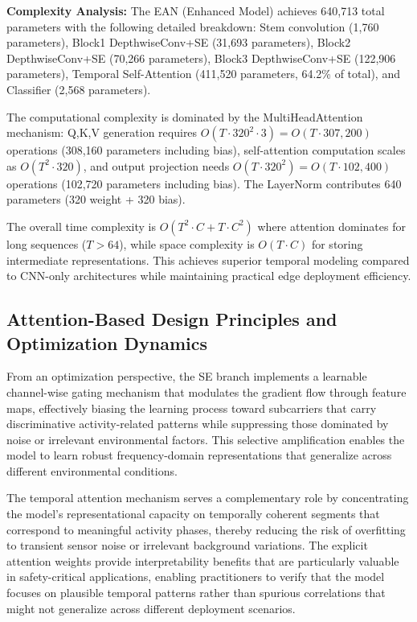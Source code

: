 \documentclass[lettersize,journal]{IEEEtran}
\begin{document}
\textbf{Complexity Analysis:} The EAN (Enhanced Model) achieves 640,713 total parameters with the following detailed breakdown: Stem convolution (1,760 parameters), Block1 DepthwiseConv+SE (31,693 parameters), Block2 DepthwiseConv+SE (70,266 parameters), Block3 DepthwiseConv+SE (122,906 parameters), Temporal Self-Attention (411,520 parameters, 64.2\% of total), and Classifier (2,568 parameters). 

The computational complexity is dominated by the MultiHeadAttention mechanism: Q,K,V generation requires $O(T \cdot 320^2 \cdot 3) = O(T \cdot 307,200)$ operations (308,160 parameters including bias), self-attention computation scales as $O(T^2 \cdot 320)$, and output projection needs $O(T \cdot 320^2) = O(T \cdot 102,400)$ operations (102,720 parameters including bias). The LayerNorm contributes 640 parameters (320 weight + 320 bias).

The overall time complexity is $O(T^2 \cdot C + T \cdot C^2)$ where attention dominates for long sequences ($T>64$), while space complexity is $O(T \cdot C)$ for storing intermediate representations. This achieves superior temporal modeling compared to CNN-only architectures while maintaining practical edge deployment efficiency.

\subsection{Attention-Based Design Principles and Optimization Dynamics}

From an optimization perspective, the SE branch implements a learnable channel-wise gating mechanism that modulates the gradient flow through feature maps, effectively biasing the learning process toward subcarriers that carry discriminative activity-related patterns while suppressing those dominated by noise or irrelevant environmental factors. This selective amplification enables the model to learn robust frequency-domain representations that generalize across different environmental conditions.

The temporal attention mechanism serves a complementary role by concentrating the model's representational capacity on temporally coherent segments that correspond to meaningful activity phases, thereby reducing the risk of overfitting to transient sensor noise or irrelevant background variations. The explicit attention weights provide interpretability benefits that are particularly valuable in safety-critical applications, enabling practitioners to verify that the model focuses on plausible temporal patterns rather than spurious correlations that might not generalize across different deployment scenarios.
\end{document}
